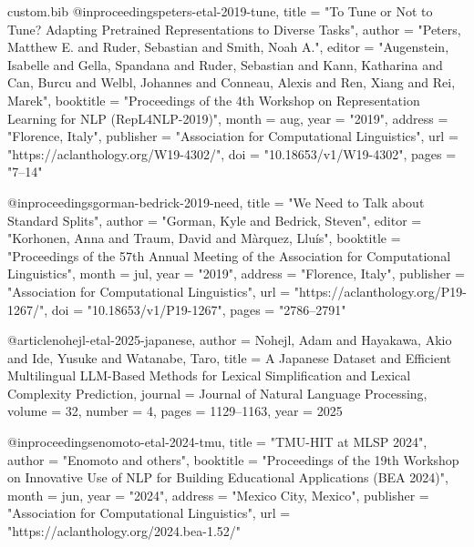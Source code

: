\begin{filecontents*}[overwrite]{custom.bib}
@inproceedings{peters-etal-2019-tune,
    title = "To Tune or Not to Tune? Adapting Pretrained Representations to Diverse Tasks",
    author = "Peters, Matthew E.  and
      Ruder, Sebastian  and
      Smith, Noah A.",
    editor = "Augenstein, Isabelle  and
      Gella, Spandana  and
      Ruder, Sebastian  and
      Kann, Katharina  and
      Can, Burcu  and
      Welbl, Johannes  and
      Conneau, Alexis  and
      Ren, Xiang  and
      Rei, Marek",
    booktitle = "Proceedings of the 4th Workshop on Representation Learning for NLP (RepL4NLP-2019)",
    month = aug,
    year = "2019",
    address = "Florence, Italy",
    publisher = "Association for Computational Linguistics",
    url = "https://aclanthology.org/W19-4302/",
    doi = "10.18653/v1/W19-4302",
    pages = "7--14"
}

@inproceedings{gorman-bedrick-2019-need,
    title = "We Need to Talk about Standard Splits",
    author = "Gorman, Kyle  and
      Bedrick, Steven",
    editor = "Korhonen, Anna  and
      Traum, David  and
      M{\`a}rquez, Llu{\'i}s",
    booktitle = "Proceedings of the 57th Annual Meeting of the Association for Computational Linguistics",
    month = jul,
    year = "2019",
    address = "Florence, Italy",
    publisher = "Association for Computational Linguistics",
    url = "https://aclanthology.org/P19-1267/",
    doi = "10.18653/v1/P19-1267",
    pages = "2786--2791"
}


@article{nohejl-etal-2025-japanese,
    author  = {Nohejl, Adam and Hayakawa, Akio and Ide, Yusuke and Watanabe, Taro},
    title   = {A {J}apanese Dataset and Efficient Multilingual {LLM}-Based Methods for Lexical Simplification and Lexical Complexity Prediction},
    journal = {Journal of Natural Language Processing},
    volume  = {32},
    number  = {4},
    pages   = {1129--1163},
    year    = {2025}
}

@inproceedings{enomoto-etal-2024-tmu,
    title     = "{TMU}-{HIT} at {MLSP} 2024",
    author    = "Enomoto and others",
    booktitle = "Proceedings of the 19th Workshop on Innovative Use of NLP for Building Educational Applications (BEA 2024)",
    month     = jun,
    year      = "2024",
    address   = "Mexico City, Mexico",
    publisher = "Association for Computational Linguistics",
    url       = "https://aclanthology.org/2024.bea-1.52/"
}


\end{filecontents*}
